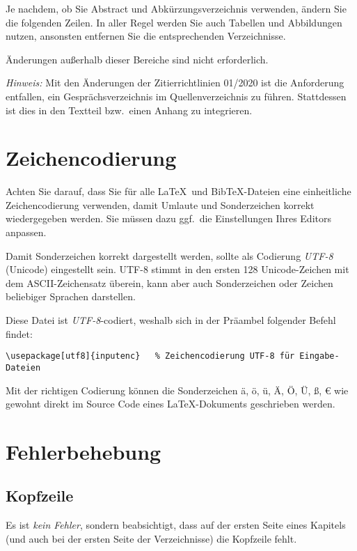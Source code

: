 Je nachdem, ob Sie Abstract und Abkürzungsverzeichnis verwenden, ändern Sie die folgenden Zeilen.
In aller Regel werden Sie auch Tabellen und Abbildungen nutzen, ansonsten entfernen Sie die entsprechenden Verzeichnisse. 


Änderungen außerhalb dieser Bereiche sind nicht erforderlich.

\emph{Hinweis:} Mit den Änderungen der Zitierrichtlinien 01/2020 ist die Anforderung entfallen, ein Gesprächsverzeichnis im Quellenverzeichnis zu führen. Stattdessen ist dies in den Textteil bzw.\ einen Anhang zu integrieren.


\section{Zeichencodierung}\label{section:zeichencodierung}

Achten Sie darauf, dass Sie für alle \LaTeX\ und BibTeX-Dateien eine einheitliche Zeichencodierung verwenden, damit Umlaute und Sonderzeichen korrekt wiedergegeben werden. Sie müssen dazu ggf.\ die Einstellungen Ihres Editors anpassen.

Damit Sonderzeichen korrekt dargestellt werden, sollte als Codierung \emph{UTF-8} (Unicode) eingestellt sein. UTF-8 stimmt in den ersten 128 Unicode-Zeichen mit dem ASCII-Zeichensatz überein, kann aber auch Sonderzeichen oder Zeichen beliebiger Sprachen darstellen.

Diese Datei ist \emph{UTF-8}-codiert, weshalb sich in der Präambel folgender Befehl findet:
\lstset{language=TeX} 
\begin{lstlisting}
\usepackage[utf8]{inputenc}   % Zeichencodierung UTF-8 für Eingabe-Dateien
\end{lstlisting}

Mit der richtigen Codierung können die Sonderzeichen ä, ö, ü, Ä, Ö, Ü, ß, € wie gewohnt direkt im Source Code eines \LaTeX-Dokuments geschrieben werden.

\section{Fehlerbehebung}\label{section:fehlerbehebung}

\subsection{Kopfzeile}
Es ist \emph{kein Fehler}, sondern beabsichtigt, dass auf der ersten Seite eines Kapitels (und auch bei der ersten Seite der Verzeichnisse) die Kopfzeile fehlt.

